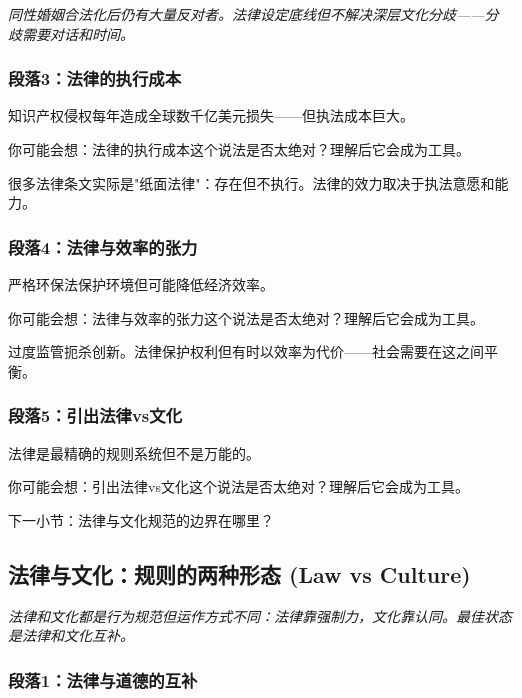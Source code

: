 \documentclass[a4paper,12pt]{book}
\newenvironment{motivation}{\begin{tcolorbox}[colback=gray!10,colframe=gray!60,title=\textit{动机}]\small\itshape}{\end{tcolorbox}}
\begin{document}
\begin{motivation}
\begin{motivation}
\begin{motivation}
\begin{motivation}
\begin{motivation}
同性婚姻合法化后仍有大量反对者。法律设定底线但不解决深层文化分歧——分歧需要对话和时间。

	\subsubsection*{段落3：法律的执行成本}
	知识产权侵权每年造成全球数千亿美元损失——但执法成本巨大。
	\begin{tcolorbox}[colback=yellow!5, title=\textit{读者行为预测}]
		你可能会想：法律的执行成本这个说法是否太绝对？理解后它会成为工具。
	\end{tcolorbox}

很多法律条文实际是"纸面法律"：存在但不执行。法律的效力取决于执法意愿和能力。

	\subsubsection*{段落4：法律与效率的张力}
	严格环保法保护环境但可能降低经济效率。
	\begin{tcolorbox}[colback=yellow!5, title=\textit{读者行为预测}]
		你可能会想：法律与效率的张力这个说法是否太绝对？理解后它会成为工具。
	\end{tcolorbox}

过度监管扼杀创新。法律保护权利但有时以效率为代价——社会需要在这之间平衡。

	\subsubsection*{段落5：引出法律vs文化}
	法律是最精确的规则系统但不是万能的。
	\begin{tcolorbox}[colback=yellow!5, title=\textit{读者行为预测}]
		你可能会想：引出法律vs文化这个说法是否太绝对？理解后它会成为工具。
	\end{tcolorbox}

下一小节：法律与文化规范的边界在哪里？

	\subsection{法律与文化：规则的两种形态 (Law vs Culture)}
	\begin{motivation}
		法律和文化都是行为规范但运作方式不同：法律靠强制力，文化靠认同。最佳状态是法律和文化互补。\end{motivation}
	\subsubsection*{段落1：法律与道德的互补}


\end{motivation}
\end{motivation}
\end{motivation}
\end{motivation}
\end{motivation}
\end{document}
